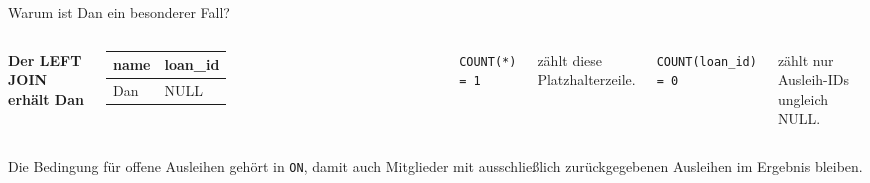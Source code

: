 \begin{frame}[t]{Warum ist Dan ein besonderer Fall?}

\begin{columns}[T,onlytextwidth]
\textbf{Der LEFT JOIN erhält Dan}\par\smallskip
\small\begin{tabular}{ll}\toprule name & loan\_id\\\midrule Dan & NULL\\\bottomrule\end{tabular}
\texttt{COUNT(*) = 1}\par\smallskip zählt diese Platzhalterzeile.\par\medskip
\texttt{COUNT(loan\_id) = 0}\par\smallskip zählt nur Ausleih-IDs ungleich NULL.
\end{columns}\vspace{5mm}
Die Bedingung für offene Ausleihen gehört in \texttt{ON}, damit auch Mitglieder mit ausschließlich zurückgegebenen Ausleihen im Ergebnis bleiben.

\end{frame}
